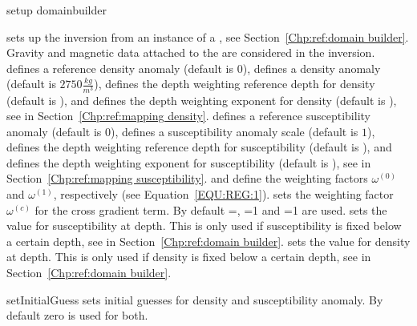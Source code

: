 \begin{methoddesc}[JointGravityMagneticInversion]{setup}{
domainbuilder
}

sets up the inversion from an instance  of a , see Section~\ref{Chp:ref:domain builder}.
Gravity and magnetic data attached to the  are considered in the inversion.
 defines a reference density anomaly (default is $0$),
 defines a density anomaly (default is $2750 \frac{kg}{m^3}$),
 defines the depth weighting reference depth for density (default is \None), and
 defines the depth weighting exponent for density (default is \None),
see  in Section~\ref{Chp:ref:mapping density}.
 defines a reference susceptibility anomaly (default is $0$),
 defines a susceptibility anomaly scale (default is $1$),
 defines the depth weighting reference depth for susceptibility (default is \None), and
 defines the depth weighting exponent for susceptibility (default is \None),
see  in Section~\ref{Chp:ref:mapping susceptibility}.
 and  define the weighting factors
$\omega^{(0)}$ and
$\omega^{(1)}$, respectively (see Equation~\ref{EQU:REG:1}). 
 sets the weighting factor $\omega^{(c)}$ for the cross gradient term. 
By default =\None, =1 and =1 are used.
 sets the value for susceptibility at depth. This is only used if susceptibility is fixed below a certain depth,
see  in Section~\ref{Chp:ref:domain builder}.
 sets the value for density at depth. This is only used if density is fixed below a certain depth,
see  in Section~\ref{Chp:ref:domain builder}.
\end{methoddesc}

\begin{methoddesc}[JointGravityMagneticInversion]{setInitialGuess}{ }
sets initial guesses for density and susceptibility anomaly.
By default zero is used for both.
\end{methoddesc}
